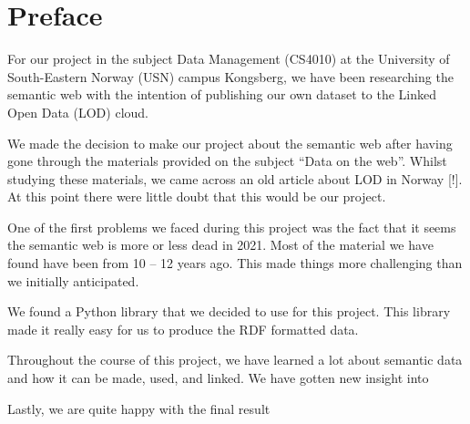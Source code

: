 \chapter*{Preface}

For our project in the subject Data Management (CS4010) at the University of South-Eastern Norway (USN) campus Kongsberg, we have been researching the semantic web with the intention of publishing our own dataset to the Linked Open Data (LOD) cloud.

\vspace{5mm}


We made the decision to make our project about the semantic web after having gone through the materials provided on the subject “Data on the web”. Whilst studying these materials, we came across an old article about LOD in Norway [!]. At this point there were little doubt that this would be our project.

\vspace{5mm}

One of the first problems we faced during this project was the fact that it seems the semantic web is more or less dead in 2021. Most of the material we have found have been from 10 – 12 years ago. This made things more challenging than we initially anticipated. 

\vspace{5mm}

We found a Python library that we decided to use for this project. This library made it really easy for us to produce the RDF formatted data.

\vspace{5mm}

Throughout the course of this project, we have learned a lot about semantic data and how it can be made, used, and linked. We have gotten new insight into 

\vspace{5mm}

Lastly, we are quite happy with the final result



